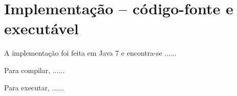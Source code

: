 \section{Implementação -- código-fonte e executável}

A implementação foi feita em Java 7 e encontra-se ......

Para compilar, ......

Para executar, ......
